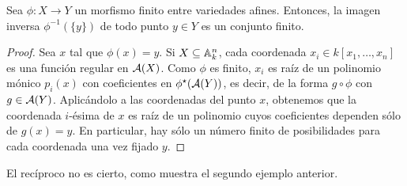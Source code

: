 \documentclass[ACGA.tex]{subfiles}
\begin{document}
\begin{prop}
 Sea $\phi:X\to Y$ un morfismo finito entre variedades afines. Entonces, la imagen inversa $\phi^{-1}(\{y\})$ de todo punto $y\in Y$ es un conjunto finito.
\end{prop}

\begin{proof}
 Sea $x$ tal que $\phi(x)=y$. Si $X\subseteq\mathbb{A}^n_k$, cada coordenada $x_i\in k[x_1,\ldots,x_n]$ es una función regular en $\mathcal{A}(X)$. Como $\phi$ es finito, $x_i$ es raíz de un polinomio mónico $p_i(x)$ con coeficientes en $\phi^\star(\mathcal{A}(Y))$, es decir, de la forma $g\circ\phi$ con $g\in\mathcal{A}(Y)$. Aplicándolo a las coordenadas del punto $x$, obtenemos que la coordenada $i$-ésima de $x$ es raíz de un polinomio cuyos coeficientes dependen sólo de $g(x)=y$. En particular, hay sólo un número finito de posibilidades para cada coordenada una vez fijado $y$.
\end{proof}

El recíproco no es cierto, como muestra el segundo ejemplo anterior.
\end{document}
